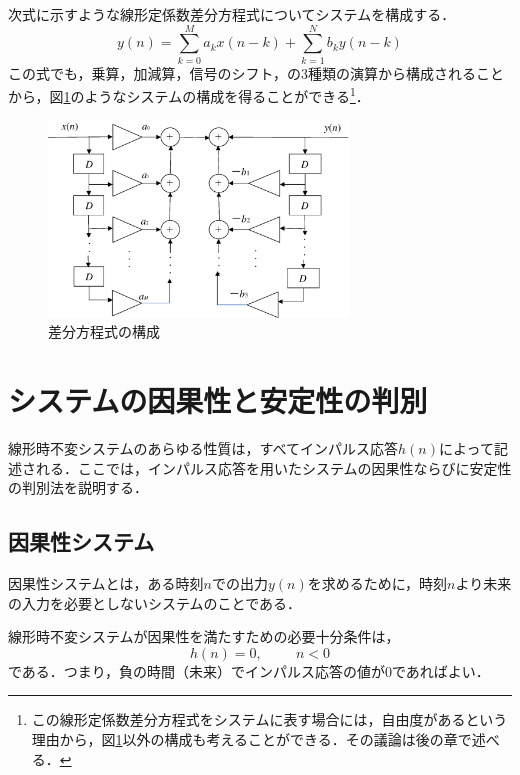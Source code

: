 次式に示すような線形定係数差分方程式についてシステムを構成する．
\begin{equation}
y(n)=\sum_{k=0}^{M}a_kx(n-k)+\sum_{k=1}^{N}b_ky(n-k)
\label{eqn:2-32-2}
\end{equation}
この式でも，乗算，加減算，信号のシフト，の3種類の演算から構成されることから，図\ref{fig:zu4-2-16}のようなシステムの構成を得ることができる\footnote{この線形定係数差分方程式をシステムに表す場合には，自由度があるという理由から，図\ref{fig:zu4-2-16}以外の構成も考えることができる．その議論は後の章で述べる．}．

\begin{figure}[H]
\begin{center}
\includegraphics[width=8cm]{fig/zu-2-16.eps}
\end{center}
\caption{差分方程式の構成}
\label{fig:zu4-2-16}
\end{figure}

\section{システムの因果性と安定性の判別}

線形時不変システムのあらゆる性質は，すべてインパルス応答$h(n)$によって記述される．ここでは，インパルス応答を用いたシステムの因果性ならびに安定性の判別法を説明する．

\subsection{因果性システム}

因果性システムとは，ある時刻$n$での出力$y(n)$を求めるために，時刻$n$より未来の入力を必要としないシステムのことである．

線形時不変システムが因果性を満たすための必要十分条件は，
\begin{equation}
h(n)=0, \hspace{1cm} n<0
\end{equation}
である．つまり，負の時間（未来）でインパルス応答の値が0であればよい．


